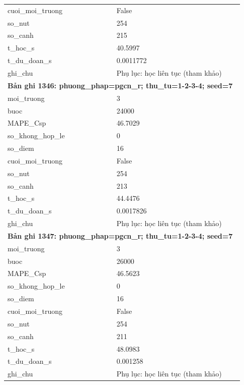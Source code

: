 \begin{longtable}{p{0.43\linewidth}p{0.50\linewidth}}
cuoi\_\allowbreak moi\_\allowbreak truong & False \\
so\_\allowbreak nut & 254 \\
so\_\allowbreak canh & 215 \\
t\_\allowbreak hoc\_\allowbreak s & 40.5997 \\
t\_\allowbreak du\_\allowbreak doan\_\allowbreak s & 0.0011772 \\
ghi\_\allowbreak chu & Phụ lục: học liên tục (tham khảo) \\
\midrule
\multicolumn{2}{p{0.95\linewidth}}{\textbf{Bản ghi 1346: phuong\_phap=pgcn\_r; thu\_tu=1-2-3-4; seed=7}} \\
moi\_\allowbreak truong & 3 \\
buoc & 24000 \\
MAPE\_\allowbreak Csp & 46.7029 \\
so\_\allowbreak khong\_\allowbreak hop\_\allowbreak le & 0 \\
so\_\allowbreak diem & 16 \\
cuoi\_\allowbreak moi\_\allowbreak truong & False \\
so\_\allowbreak nut & 254 \\
so\_\allowbreak canh & 213 \\
t\_\allowbreak hoc\_\allowbreak s & 44.4476 \\
t\_\allowbreak du\_\allowbreak doan\_\allowbreak s & 0.0017826 \\
ghi\_\allowbreak chu & Phụ lục: học liên tục (tham khảo) \\
\midrule
\multicolumn{2}{p{0.95\linewidth}}{\textbf{Bản ghi 1347: phuong\_phap=pgcn\_r; thu\_tu=1-2-3-4; seed=7}} \\
moi\_\allowbreak truong & 3 \\
buoc & 26000 \\
MAPE\_\allowbreak Csp & 46.5623 \\
so\_\allowbreak khong\_\allowbreak hop\_\allowbreak le & 0 \\
so\_\allowbreak diem & 16 \\
cuoi\_\allowbreak moi\_\allowbreak truong & False \\
so\_\allowbreak nut & 254 \\
so\_\allowbreak canh & 211 \\
t\_\allowbreak hoc\_\allowbreak s & 48.0983 \\
t\_\allowbreak du\_\allowbreak doan\_\allowbreak s & 0.001258 \\
ghi\_\allowbreak chu & Phụ lục: học liên tục (tham khảo) \\

\end{longtable}
